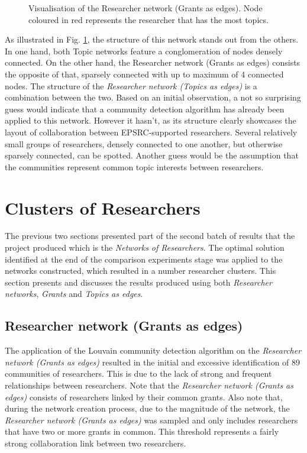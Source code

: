 {\begin{figure}[htpb]
    \centering
    \caption{Visualisation of the Researcher network (Grants as edges). Node coloured in red represents the researcher that has the most topics.}
    \label{fig:researcher_a_vis}
\end{figure}

As illustrated in Fig. \ref{fig:researcher_a_vis}, the structure of this network stands out from the others. In one hand, both Topic networks feature a conglomeration of nodes densely connected. On the other hand, the Researcher network (Grants as edges) consists the opposite of that, sparsely connected with up to maximum of 4 connected nodes. The structure of the \textit{Researcher network (Topics as edges)} is a combination between the two. Based on an initial observation, a not so surprising guess would indicate that a community detection algorithm has already been applied to this network. However it hasn't, as its structure clearly showcases the layout of collaboration between EPSRC-supported researchers. Several relatively small groups of researchers, densely connected to one another, but otherwise sparsely connected, can be spotted. Another guess would be the assumption that the communities represent common topic interests between researchers.

\section{Clusters of Researchers}

The previous two sections presented part of the second batch of results that the project produced which is the \textit{Networks of Researchers}. The optimal solution identified at the end of the comparison experiments stage was applied to the networks constructed, which resulted in a number researcher clusters. This section presents and discusses the results produced using both \textit{Researcher networks}, \textit{Grants} and \textit{Topics as edges}.

\subsection{Researcher network (Grants as edges)}

The application of the Louvain community detection algorithm on the \textit{Researcher network (Grants as edges)} resulted in the initial and excessive identification of 89 communities of researchers. This is due to the lack of strong and frequent relationships between researchers. Note that the \textit{Researcher network (Grants as edges)} consists of researchers linked by their common grants. Also note that, during the network creation process, due to the magnitude of the network, the \textit{Researcher network (Grants as edges)} was sampled and only includes researchers that have two or more grants in common. This threshold represents a fairly strong collaboration link between two researchers.

}
